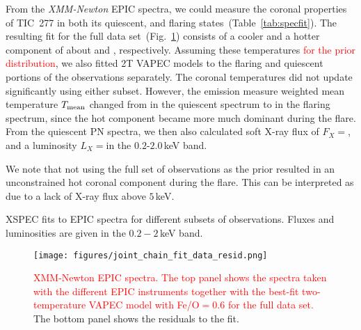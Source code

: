 \documentclass[twocolumn]{aastex631}
\begin{document}
From the \textit{XMM-Newton} EPIC spectra, we could measure the coronal properties of TIC~277 in both its quiescent, and flaring states~(Table~\ref{tab:specfit}). The resulting fit for the full data set~(Fig.~\ref{fig:spec_joint_all}) consists of a cooler and a hotter component of about \Tcool and \Thot\hspace{-1.cm}, respectively. Assuming these temperatures \textcolor{red}{for the prior distribution}, we also fitted 2T VAPEC models to the flaring and quiescent portions of the observations separately. The coronal temperatures did not update significantly using either subset. However, the emission measure weighted mean temperature $T_{\rm mean}$ changed from \Tqmean in the quiescent spectrum to \Tfmean in the flaring spectrum, since the hot component became more much dominant during the flare. From the quiescent PN spectra, we then also calculated soft X-ray flux of $F_X=$\FX, and a luminosity $L_X=$\LXquiet in the $0.2$-$2.0\,$keV band. %

We note that not using the full set of observations as the prior resulted in an unconstrained hot coronal component during the flare. This can be interpreted as due to a lack of X-ray flux above $5\,$keV. %


 \begin{table}
\footnotesize
\centering
    \caption{XSPEC fits to EPIC spectra for different subsets of observations. Fluxes and luminosities are given in the $0.2-2\,$keV band.}
    
        \label{tab:specfit}
\end{table}


\begin{figure}
    \begin{centering}
        \texttt{[image: figures/joint\_chain\_fit\_data\_resid.png]}
        \caption{
         \textcolor{red}{XMM-Newton EPIC spectra. The top panel shows the spectra taken with the different EPIC instruments together with the best-fit two-temperature VAPEC model with Fe/O$=0.6$ for the full data set.} The bottom panel shows the residuals to the fit.
        }
        \label{fig:spec_joint_all}
    \end{centering}
\end{figure}
\end{document}
